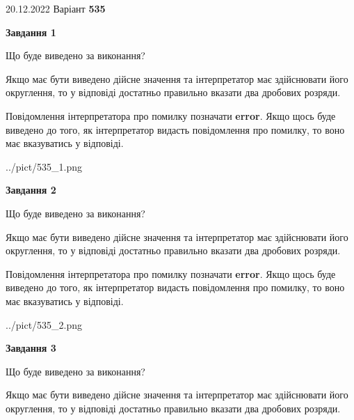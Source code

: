 \documentclass[12pt, ukrainian]{article}
\begin{document}
{20.12.2022 Варіант \No \textbf { 535 }\par}
{
\begin {Large}

{\begin {center}\textbf{Завдання 1}\end {center}}\par
Що буде виведено за виконання? \par

Якщо має бути виведено дійсне значення та інтерпретатор має здійснювати його округлення, 
то у відповіді достатньо правильно вказати два дробових розряди.

Повідомлення інтерпретатора про помилку позначати \textbf{error}.
Якщо щось буде виведено до того, як інтерпретатор видасть повідомлення про помилку, 
то воно має вказуватись у відповіді. \par

\begin{center}
	{../pict/535_1.png}
\end{center}
\newpage

{\begin {center}\textbf{Завдання 2}\end {center}}\par
Що буде виведено за виконання? \par

Якщо має бути виведено дійсне значення та інтерпретатор має здійснювати його округлення, 
то у відповіді достатньо правильно вказати два дробових розряди.

Повідомлення інтерпретатора про помилку позначати \textbf{error}.
Якщо щось буде виведено до того, як інтерпретатор видасть повідомлення про помилку, 
то воно має вказуватись у відповіді. \par

\begin{center}
	{../pict/535_2.png}
\end{center}
\newpage

{\begin {center}\textbf{Завдання 3}\end {center}}\par
Що буде виведено за виконання? \par

Якщо має бути виведено дійсне значення та інтерпретатор має здійснювати його округлення, 
то у відповіді достатньо правильно вказати два дробових розряди.


\end{Large}}
\end{document}
